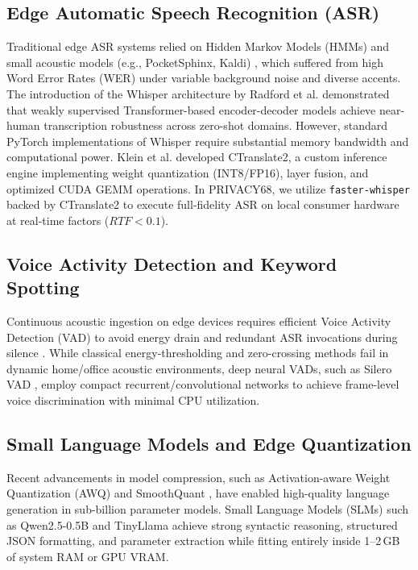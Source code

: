 \documentclass[conference]{IEEEtran}
\begin{document}
\subsection{Edge Automatic Speech Recognition (ASR)}
Traditional edge ASR systems relied on Hidden Markov Models (HMMs) and small acoustic models (e.g., PocketSphinx, Kaldi) \cite{gulati2020conformer}, which suffered from high Word Error Rates (WER) under variable background noise and diverse accents. The introduction of the Whisper architecture by Radford et al. \cite{radford2023robust} demonstrated that weakly supervised Transformer-based encoder-decoder models achieve near-human transcription robustness across zero-shot domains. However, standard PyTorch implementations of Whisper require substantial memory bandwidth and computational power. Klein et al. \cite{klein2020ctranslate2} developed CTranslate2, a custom inference engine implementing weight quantization (INT8/FP16), layer fusion, and optimized CUDA GEMM operations. In PRIVACY68, we utilize \texttt{faster-whisper} backed by CTranslate2 to execute full-fidelity ASR on local consumer hardware at real-time factors ($RTF < 0.1$).

\subsection{Voice Activity Detection and Keyword Spotting}
Continuous acoustic ingestion on edge devices requires efficient Voice Activity Detection (VAD) to avoid energy drain and redundant ASR invocations during silence \cite{chen2020streaming}. While classical energy-thresholding and zero-crossing methods fail in dynamic home/office acoustic environments, deep neural VADs, such as Silero VAD \cite{silerovad2021}, employ compact recurrent/convolutional networks to achieve frame-level voice discrimination with minimal CPU utilization.

\subsection{Small Language Models and Edge Quantization}
Recent advancements in model compression, such as Activation-aware Weight Quantization (AWQ) \cite{lin2024awq} and SmoothQuant \cite{xiao2023smoothquant}, have enabled high-quality language generation in sub-billion parameter models. Small Language Models (SLMs) such as Qwen2.5-0.5B \cite{qwen2024} and TinyLlama \cite{zhang2024tinyllama} achieve strong syntactic reasoning, structured JSON formatting, and parameter extraction while fitting entirely inside 1--2\,GB of system RAM or GPU VRAM.
\end{document}
